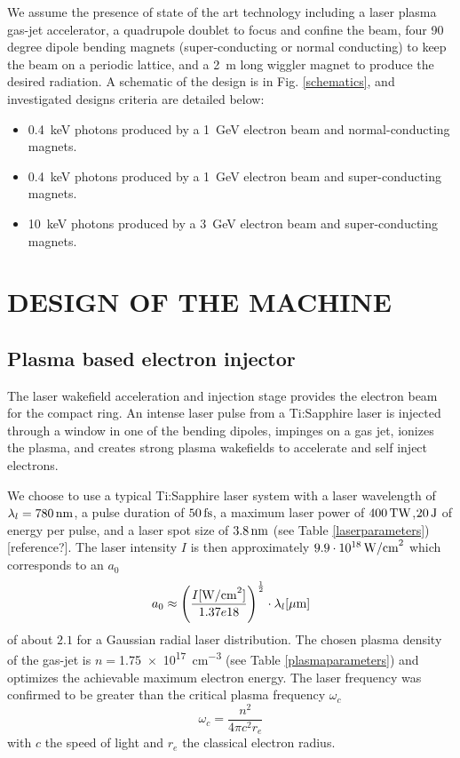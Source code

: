 \documentclass[a4paper,
              ]{jacow}
\begin{document}
We assume the presence of state of the art technology including a laser plasma gas-jet accelerator, a quadrupole doublet to focus and confine the beam, four 90 degree dipole bending magnets (super-conducting or normal conducting) to keep the beam on a periodic lattice, and a \SI{2}{m} long wiggler magnet to produce the desired radiation. A schematic of the design is in Fig. \ref{schematics}, and investigated designs criteria are detailed below: 
\begin{itemize}
\item \SI{0.4}{keV} photons produced by a \SI{1}{GeV} electron beam and normal-conducting magnets.
\item \SI{0.4}{keV} photons produced by a \SI{1}{GeV} electron beam and super-conducting magnets.
\item \SI{10}{keV} photons produced by a \SI{3}{GeV} electron beam and super-conducting magnets.
\end{itemize}

\section{DESIGN OF THE MACHINE}
\subsection{Plasma based electron injector}

The laser wakefield acceleration and injection stage provides the electron beam for the compact ring. An intense laser pulse from a Ti:Sapphire laser is injected through a window in one of the bending dipoles, impinges on a gas jet, ionizes the plasma, and creates strong plasma wakefields to accelerate and self inject electrons. 

We choose to use a typical Ti:Sapphire laser system with a laser wavelength of $\lambda_l = 780\,\rm{nm}$, a pulse duration of $50\,\rm{fs}$, a maximum laser power of $400\,\rm{TW}$,$20\,\rm{J}$ of energy per pulse, and a laser spot size of $3.8\,\rm{nm}$ (see Table \ref{laserparameters})[reference?]. The laser intensity $I$ is then approximately $9.9\cdot10^{18}\,\rm{W/cm}^2$ which corresponds to an $a_0$ 
\begin{equation}
a_0 \approx \left( \frac{I [\rm{W/cm}^2]}{1.37e18} \right) ^{\frac{1}{2}} \cdot \lambda_l[\mu\rm{m}]
\end{equation}
of about $2.1$ for a Gaussian radial laser distribution.
The chosen plasma density of the gas-jet is $n = $\SI{1.75e17}{cm^{-3}} (see Table    \ref{plasmaparameters}) and optimizes the achievable maximum electron energy. The laser frequency was confirmed to be greater than the critical plasma frequency $\omega_c$
\begin{equation}
\omega_c = \frac{n^2}{4 \pi c^2 r_e}
\end{equation}
with $c$ the speed of light and $r_e$ the classical electron radius.
\end{document}
